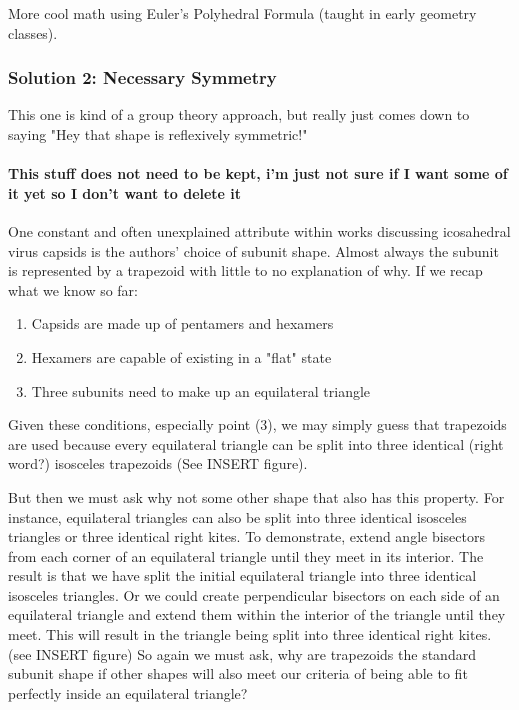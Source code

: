 \documentclass[12pt,letter]{article}
\begin{document}
More cool math using Euler's Polyhedral Formula (taught in early geometry classes). \cite{Mannige:2008}

\subsubsection{Solution 2: Necessary Symmetry}
This one is kind of a group theory approach, but really just comes down to saying "Hey that shape is reflexively symmetric!" \cite{Mannige:2008}

\paragraph{This stuff does not need to be kept, i'm just not sure if I want some of it yet so I don't want to delete it}
One constant and often unexplained attribute within works discussing icosahedral virus capsids is the authors' choice of subunit shape. Almost always the subunit is represented by a trapezoid with little to no explanation of why. If we recap what we know so far:
\begin{enumerate}
	\item Capsids are made up of pentamers and hexamers
	\item Hexamers are capable of existing in a "flat" state
	\item Three subunits need to make up an equilateral triangle
\end{enumerate}
Given these conditions, especially point (3), we may simply guess that trapezoids are used because every equilateral triangle can be split into three identical (right word?) isosceles trapezoids (See INSERT figure). 

But then we must ask why not some other shape that also has this property. For instance, equilateral triangles can also be split into three identical isosceles triangles or three identical right kites. To demonstrate, extend angle bisectors from each corner of an equilateral triangle until they meet in its interior. The result is that we have split the initial equilateral triangle into three identical isosceles triangles. Or we could create perpendicular bisectors on each side of an equilateral triangle and extend them within the interior of the triangle until they meet. This will result in the triangle being split into three identical right kites. (see INSERT figure) So again we must ask, why are trapezoids the standard subunit shape if other shapes will also meet our criteria of being able to fit perfectly inside an equilateral triangle?
\end{document}
